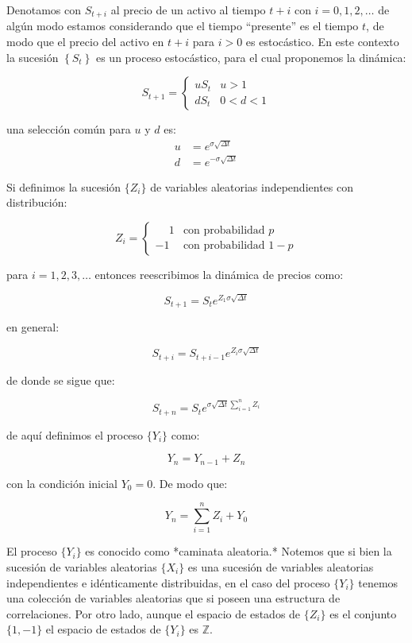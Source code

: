 \documentclass{extreport}
\theoremstyle{definicion}
\theoremstyle{propiedad}
\theoremstyle{teorema}
\begin{document}
Denotamos con $S_{t+i}$ al  precio de un activo al tiempo $t+i$ con $i=0,1,2,\ldots$ de algún modo estamos considerando que el tiempo “presente” es el tiempo $t$, de modo que el precio del activo en $t+i$ para $i>0$ es estocástico. En este contexto  la sucesión $\left\{S_t\right\}$ es un proceso estocástico, para el cual proponemos la dinámica: 

$$
S_{t+1} = \begin{cases}
    uS_t & u>1 \\ 
    dS_t & 0<d<1
\end{cases}
$$

una selección común para $u$ y $d$ es:
\begin{align*}
    u  & = e^{\sigma \sqrt{\Delta t}}\\
    d  & = e^{-\sigma \sqrt{\Delta t}}
\end{align*}

Si definimos la sucesión $\{Z_i\}$ de variables aleatorias independientes con distribución:

$$
Z_i = \begin{cases} \phantom{-}1 & \text{con probabilidad }p  \\ 
-1 & \text{con probabilidad }1-p\end{cases}
$$

para $i = 1,2,3,\ldots$ entonces reescribimos la dinámica de precios como:

$$
S_{t+1} = S_te^{Z_1\sigma\sqrt{\Delta t}}
$$

en general:

$$
S_{t+i} = S_{t+i-1}e^{Z_{i}\sigma\sqrt{\Delta t}}
$$

de donde se sigue que:

$$
S_{t+n} = S_{t}e^{\sigma\sqrt{\Delta t}\sum_{i=1}^nZ_i}
$$

de aquí definimos el proceso $\{Y_i\}$  como:

$$
Y_n = Y_{n-1} + Z_n
$$

con la condición inicial $Y_0 = 0$. De modo que:

$$
Y_n = \sum_{i=1}^n Z_i + Y_0
$$

El proceso $\{Y_i\}$ es conocido como *caminata aleatoria.* Notemos que si bien la sucesión de variables aleatorias $\{X_i\}$ es una sucesión de variables aleatorias independientes e idénticamente distribuidas, en el caso del proceso $\{Y_i\}$ tenemos una colección de variables aleatorias que si poseen una estructura de correlaciones. Por otro lado, aunque el espacio de estados de $\{Z_i\}$ es el conjunto $\{1,-1\}$ el espacio de estados de $\{Y_i\}$ es $\mathbb{Z}.$ 
\end{document}
